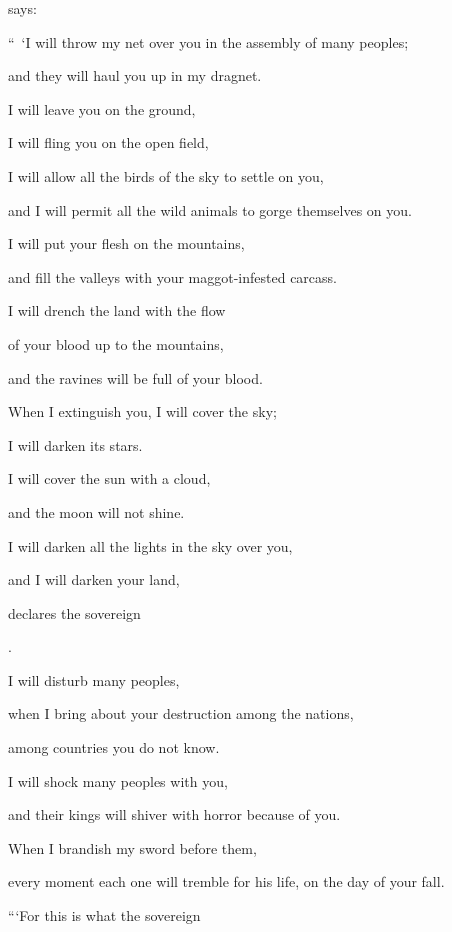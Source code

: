 {{}
says:
\par }{\Q “ ‘I
will throw
my net
over you in the assembly
of many
peoples;
\par }{\Q and they will haul
you up
in my dragnet.
\par }{\Q {}I will leave
you on
the ground,
\par }{\Q I will fling
you on the open field,
\par }{\Q I will allow
all
the birds
of the sky
to settle on
you,
\par }{\Q and I will permit
all
the wild animals
to gorge
themselves on you.
\par }{\Q {}I will put
your flesh
on
the mountains,
\par }{\Q and fill
the valleys
with your maggot-infested carcass.
\par }{\Q {}I will drench
the land
with the flow
\par }{\Q of your blood
up to
the mountains,
\par }{\Q and the ravines
will be full
of your blood.
\par }{\Q {}When I extinguish
you, I will cover
the sky;
\par }{\Q I will darken
its stars.
\par }{\Q I will cover
the sun
with a cloud,
\par }{\Q and the moon
will not
shine.
\par }{\Q {}I will darken
all
the lights
in the sky
over
you,
\par }{\Q and I will darken
your land,
\par }{\Q declares
the sovereign

{}.
\par }{\Q {}I will disturb
many
peoples,
\par }{\Q when I bring
about your destruction
among the nations,
\par }{\Q among countries
you do not
know.
\par }{\Q {}I will shock
many
peoples
with you,
\par }{\Q and their kings
will shiver
with horror
because of you.
\par }{\Q When
I brandish
my sword
before
them,
\par }{\Q every moment
each
one will tremble
for his life,
on the day
of your fall.
\par }{\PP {}“‘For
this is what
the sovereign

}
